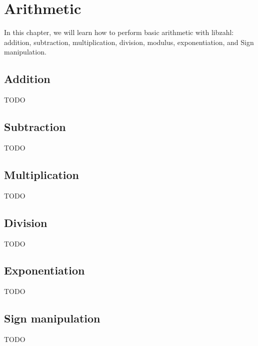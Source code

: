 \chapter{Arithmetic}
\label{chap:Arithmetic}

In this chapter, we will learn how to perform basic
arithmetic with libzahl: addition, subtraction,
multiplication, division, modulus, exponentiation,
and Sign manipulation.

\vspace{1cm}
\minitoc


\newpage
\section{Addition}
\label{sec:Addition}

TODO %


\newpage
\section{Subtraction}
\label{sec:Subtraction}

TODO %


\newpage
\section{Multiplication}
\label{sec:Multiplication}

TODO %


\newpage
\section{Division}
\label{sec:Division}

TODO %


\newpage
\section{Exponentiation}
\label{sec:Exponentiation}

TODO %


\newpage
\section{Sign manipulation}
\label{sec:Sign manipulation}

TODO %
